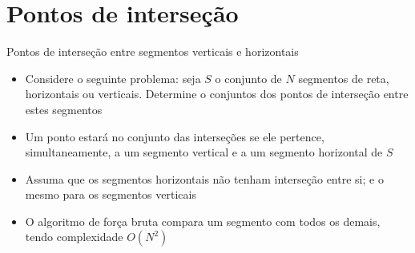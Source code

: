 \section{Pontos de interseção}

\begin{frame}[fragile]{Pontos de interseção entre segmentos verticais e horizontais}

    \begin{itemize}
        \item Considere o seguinte problema: seja $S$ o conjunto de $N$ segmentos de reta, 
            horizontais ou verticais. Determine o conjuntos dos pontos de interseção
            entre estes segmentos

        \item Um ponto estará no conjunto das interseções se ele pertence, simultaneamente, a
            um segmento vertical e a um segmento horizontal de $S$

        \item Assuma que os segmentos horizontais não tenham interseção entre si; e o mesmo para
            os segmentos verticais

        \item O algoritmo de força bruta compara um segmento com todos os demais, tendo
            complexidade $O(N^2)$
    \end{itemize}

\end{frame}



